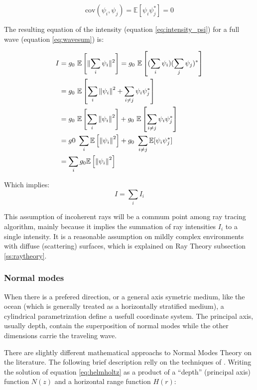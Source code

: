 \begin{equation}
\label{eq:wave_uncorr}
\text{cov}(\psi_i,\psi_j) = \mathbb{E}[\psi_i \psi_j^*] = 0
\end{equation}

The resulting equation of the intensity (equation \ref{eq:intensity_psi}) for a
full wave (equation \ref{eq:wavesum}) is:

\begin{equation*}
\begin{split}
I &= g_0~\mathbb{E}\left[\lVert \sum_i \psi_i \rVert ^2\right] =
g_0~\mathbb{E}\left[ (\sum_i \psi_i)(\sum_j \psi_j)^*\right] \\
&= g_0~\mathbb{E}\left[\sum_i \left\lVert\psi_i\right\rVert^2 + \sum_{i \neq j} \psi_i
\psi_j^*\right] \\
&= g_0~\mathbb{E}\left[\sum_i \left\lVert\psi_i\right\rVert^2\right]  +
g_0~\mathbb{E}\left[\sum_{i \neq j} \psi_i \psi_j^*\right] \\
& = g0~\sum_i \mathbb{E}\left[\left\lVert\psi_i\right\rVert^2\right]  + g_0~\sum_{i \neq j}
\mathbb{E}[\psi_i \psi_j^*] \\
& = \sum_i g_0\mathbb{E}\left[\left\lVert\psi_i\right\rVert^2\right]
\end{split}
\end{equation*}

Which implies:
\begin{equation}
\label{eq:intensity_sum}
I = \sum_i I_i
\end{equation}

This assumption of incoherent rays will be a commum point among ray tracing
algorithm, mainly because it implies the summation of ray intensities $I_i$ to a
single intensity. It is a reasonable assumption on mildly complex environments
with diffuse (scattering) surfaces, which is explained on Ray Theory subsection
\ref{ss:raytheory}.


\subsubsection{Normal modes}

When there is a prefered direction, or a general axis symetric medium, like the
ocean (which is generally treated as a horizontally stratified medium), a
cylindrical parametrization define a usefull coordinate system. The principal
axis, usually depth, contain the superposition of normal modes while the other
dimensions carrie the traveling wave.

There are slightly different mathematical approachs to Normal Modes Theory on
the literature\cite{Etter2013,urick1979,buckingham1992ocean}. The following
brief description relly on the techniques of \citet{Etter2013}. Writing the
solution of equation \ref{eq:helmholtz} as a product of a ``depth'' (principal
axis) function $N(z)$ and a horizontal range function $H(r)$:

